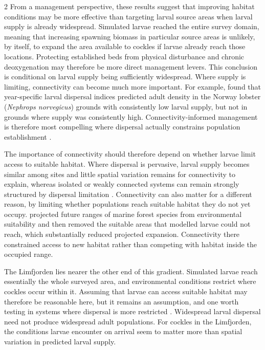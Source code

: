 \begin{spacing}{2}
From a management perspective, these results suggest that improving habitat conditions may be more effective than targeting larval source areas when larval supply is already widespread. Simulated larvae reached  the entire survey domain, meaning that increasing spawning biomass in particular source areas is unlikely, by itself, to expand the area available to cockles if larvae already reach those locations. Protecting established beds from physical disturbance and chronic deoxygenation may therefore be more direct management levers. This conclusion is conditional on larval supply being sufficiently widespread. Where supply is limiting, connectivity can become much more important. For example, \citet{mcgeadyLongtermInterannualVariability2022} found that year-specific larval dispersal indices predicted adult density in the Norway lobster (\textit{Nephrops norvegicus}) grounds with consistently low larval supply, but not in grounds where supply was consistently high. Connectivity-informed management is therefore most compelling where dispersal actually constrains population establishment \citep{griecoDesigningDispersalConnectivityinformed2026}.

The importance of connectivity should therefore depend on whether larvae limit access to suitable habitat. Where dispersal is pervasive, larval supply becomes similar among sites and little spatial variation remains for connectivity to explain, whereas isolated or weakly connected systems can remain strongly structured by dispersal limitation
\citep{heinoMetacommunityOrganisationSpatial2015}. Connectivity can also matter for a different reason, by limiting whether populations reach suitable habitat they do not yet occupy. \citet{assisOceanographicConnectivityStrongly2026} projected future ranges of marine forest species from environmental suitability and then removed the suitable areas that modelled larvae could not reach, which substantially reduced projected expansion. Connectivity there constrained access
to new habitat rather than competing with habitat inside the occupied range.

The Limfjorden lies nearer the other end of this gradient. Simulated larvae
reach essentially the whole surveyed area, and environmental conditions restrict where cockles occur within it. Assuming that larvae can access suitable habitat may therefore be reasonable here, but it remains an assumption, and one worth testing in systems where dispersal is more restricted \citep{barveCrucialRoleAccessible2011}. Widespread larval dispersal need not produce widespread adult populations. For cockles in the Limfjorden, the conditions larvae encounter on arrival seem to matter more than spatial variation in predicted larval supply.

\end{spacing}
